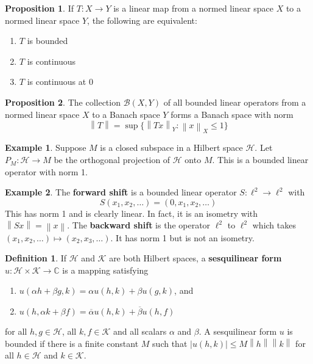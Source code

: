 \documentclass{article}
\theoremstyle{definition}
\newtheorem{example}{Example}
\newtheorem*{defn}{Definition}
\newtheorem{proposition}{Proposition}
\newcommand{\norm}[1]{\left\lVert#1\right\rVert}
\begin{document}
    \begin{proposition}
        If $T:X\to Y$ is a linear map from a normed linear space $X$ to a normed linear space $Y$, the following are equivalent:
        \begin{enumerate}
            \item $T$ is bounded
            \item $T$ is continuous
            \item $T$ is continuous at 0
        \end{enumerate}
    \end{proposition}

    \begin{proposition}
        The collection $\mathcal{B}(X,Y)$ of all bounded linear operators from a normed linear space $X$ to a Banach space
        $Y$ forms a Banach space with norm
        \[ \norm{T} = \sup\{\norm{Tx}_Y: \norm{x}_X\leq 1\} \]
    \end{proposition}

    \begin{example}
        Suppose $M$ is a closed subspace in a Hilbert space $\mathcal{H}$. Let $P_M:\mathcal{H}\to M$ be the orthogonal projection 
        of $\mathcal{H}$ onto $M$. This is a bounded linear operator with norm 1.
    \end{example}

    \begin{example}
        The \textbf{forward shift} is a bounded linear operator $S:\ell^2\to \ell^2$ with
        \[ S(x_1,x_2,\hdots) = (0,x_1,x_2,\hdots) \]
        This has norm 1 and is clearly linear. In fact, it is an isometry with $\norm{Sx} = \norm{x}$. The \textbf{backward shift}
        is the operator $\ell^2$ to $\ell^2$ which takes $(x_1,x_2,\hdots) \mapsto (x_2,x_3,\hdots)$. It has norm 1 but is not an
        isometry.
    \end{example}

    \begin{defn}
        If $\mathcal{H}$ and $\mathcal{K}$ are both Hilbert spaces, a \textbf{sesquilinear form} 
        $u:\mathcal{H}\times\mathcal{K}\to\mathbb{C}$ is a mapping satisfying
        \begin{enumerate}
            \item $u(\alpha h + \beta g, k) = \alpha u(h,k) + \beta u(g,k)$, and
            \item $u(h,\alpha k + \beta f) = \overline{\alpha} u(h,k) + \overline{\beta} u(h,f)$
        \end{enumerate}
        for all $h,g\in\mathcal{H}$, all $k,f\in\mathcal{K}$ and all scalars $\alpha$ and $\beta$. A sesquilinear form $u$ is
        bounded if there is a finite constant $M$ such that $|u(h,k)|\leq M\norm{h}\norm{k}$ for all $h\in\mathcal{H}$ and
        $k\in\mathcal{K}$.
    \end{defn}
\end{document}
